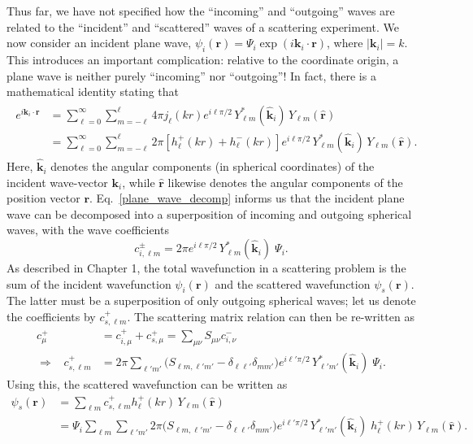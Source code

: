 \documentclass[pra,12pt]{revtex4}
\begin{document}
Thus far, we have not specified how the ``incoming'' and ``outgoing''
waves are related to the ``incident'' and ``scattered'' waves of a
scattering experiment.  We now consider an incident plane wave,
$\psi_i(\mathbf{r}) = \Psi_i \exp(i\mathbf{k}_i\cdot \mathbf{r})$,
where $|\mathbf{k}_i| = k$.  This introduces an important
complication: relative to the coordinate origin, a plane wave is
neither purely ``incoming'' nor ``outgoing''!  In fact, there is a
mathematical identity stating that
\begin{align}
  \begin{aligned}e^{i\mathbf{k}_i \cdot \mathbf{r}} &= \sum_{\ell=0}^\infty \sum_{m=-\ell}^\ell 4 \pi j_{\ell}(kr) e^{i\ell\pi/2} \, Y_{\ell m}^*(\hat{\mathbf{k}}_i) \, Y_{\ell m}(\hat{\mathbf{r}})\\ &= \sum_{\ell=0}^\infty \sum_{m=-\ell}^\ell 2 \pi \left[h_{\ell}^+(kr) + h_{\ell}^-(kr)\right] e^{i\ell\pi/2} \, Y_{\ell m}^*(\hat{\mathbf{k}}_i) \, Y_{\ell m}(\hat{\mathbf{r}}).\end{aligned}
  \label{plane_wave_decomp}
\end{align}
Here, $\hat{\mathbf{k}}_i$ denotes the angular components (in
spherical coordinates) of the incident wave-vector $\mathbf{k}_i$,
while $\hat{\mathbf{r}}$ likewise denotes the angular components of
the position vector $\mathbf{r}$.  Eq.~\eqref{plane_wave_decomp}
informs us that the incident plane wave can be decomposed into a
superposition of incoming and outgoing spherical waves, with the wave
coefficients
\begin{equation}
  c^{\pm}_{i, \ell m} = 2 \pi e^{i\ell\pi/2} \, Y_{\ell m}^*(\hat{\mathbf{k}}_i)\; \Psi_i.
\end{equation}
As described in Chapter 1, the total wavefunction in a scattering
problem is the sum of the incident wavefunction $\psi_i(\mathbf{r})$
and the scattered wavefunction $\psi_s(\mathbf{r})$.  The latter must
be a superposition of only outgoing spherical waves; let us denote the
coefficients by $c^+_{s,\ell m}$.  The scattering matrix relation can
then be re-written as
\begin{align}
  c^+_\mu &= c^+_{i,\mu} + c^+_{s,\mu} = \sum_{\mu\nu} S_{\mu\nu} c^-_{i,\nu} \\ \Rightarrow \;\;\; c^+_{s,\ell m} &= 2 \pi \sum_{\ell' m'} \Big(S_{\ell m, \ell' m'} - \delta_{\ell \ell'}\delta_{mm'}\Big) e^{i\ell'\pi/2} \, Y_{\ell' m'}^*(\hat{\mathbf{k}}_i)\; \Psi_i.
\end{align}
Using this, the scattered wavefunction can be written as
\begin{equation}
  \begin{aligned}\psi_s(\mathbf{r}) &= \sum_{\ell m} c^+_{s,\ell m} h_{\ell}^+(kr) \, Y_{\ell m}(\hat{\mathbf{r}}) \\ &= \Psi_i \sum_{\ell m} \sum_{\ell' m'} 2 \pi \Big(S_{\ell m, \ell' m'} - \delta_{\ell \ell'}\delta_{mm'}\Big) e^{i\ell'\pi/2} \, Y_{\ell' m'}^*(\hat{\mathbf{k}}_i)\; h_{\ell}^+(kr) \, Y_{\ell m}(\hat{\mathbf{r}}).\end{aligned}
\end{equation}
\end{document}

